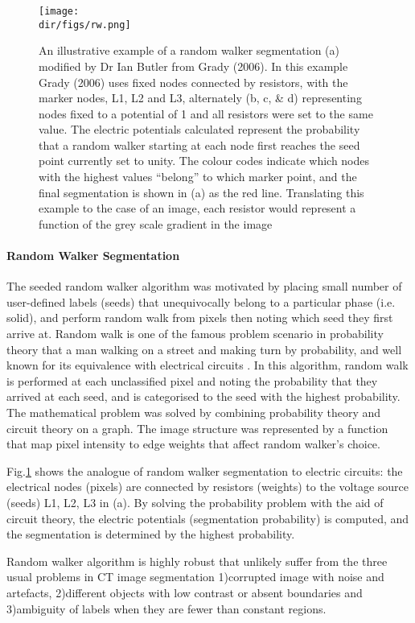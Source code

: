 \begin{figure}[htbp]
  \centering
  \texttt{[image: \\dir/figs/rw.png]}
  \caption{An illustrative example of a random walker segmentation (a) modified by Dr Ian Butler from Grady (2006). In this example Grady (2006) uses fixed nodes connected by resistors, with the marker nodes, L1, L2 and L3, alternately (b, c, \& d) representing nodes fixed to a potential of 1 and all resistors were set to the same value. The electric potentials calculated represent the probability that a random walker starting at each node first reaches the seed point currently set to unity. The colour codes indicate which nodes with the highest values “belong” to which marker point, and the final segmentation is shown in (a) as the red line. Translating this example to the case of an image, each resistor would represent a function of the grey scale gradient in the image}
  \label{rw}
\end{figure}

\paragraph{Random Walker Segmentation}
The seeded random walker algorithm was motivated by placing small number of user-defined labels (seeds) that unequivocally belong to a particular phase (i.e. solid), and perform random walk from pixels then noting which seed they first arrive at. Random walk is one of the famous problem scenario in probability theory that a man walking on a street and making turn by probability, and well known for its equivalence with electrical circuits \citep{doyle1984random}. In this algorithm, random walk is performed at each unclassified pixel and noting the probability that they arrived at each seed, and is categorised to the seed with the highest probability. The mathematical problem was solved by combining probability theory and circuit theory on a graph. The image structure was represented by a function that map pixel intensity to edge weights that affect random walker's choice.  

Fig.\ref{rw} shows the analogue of random walker segmentation to electric circuits: the electrical nodes (pixels) are connected by resistors (weights) to the voltage source (seeds) L1, L2, L3 in (a). By solving the probability problem with the aid of circuit theory, the electric potentials (segmentation probability) is computed, and the segmentation is determined by the highest probability.

Random walker algorithm is highly robust that unlikely suffer from the three usual problems in CT image segmentation 1)corrupted image with noise and artefacts, 2)different objects with low contrast or absent boundaries and 3)ambiguity of labels when they are fewer than constant regions. 

